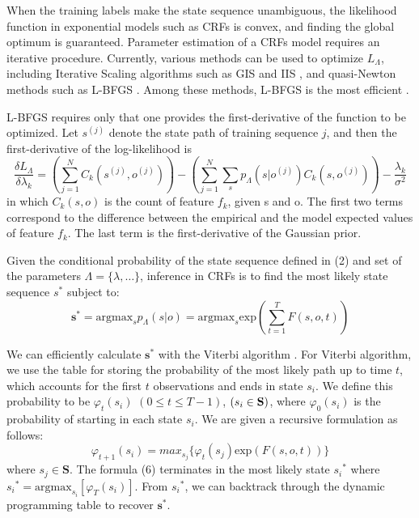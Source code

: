 \documentclass[english]{jnlp_1.4}
\begin{document}
When the training labels make the state sequence unambiguous, the
likelihood function in exponential models such as CRFs is convex,
and finding the global optimum is guaranteed. Parameter estimation
of a CRFs model requires an iterative procedure. Currently, various
methods can be used to optimize $L_\Lambda$, including Iterative
Scaling algorithms such as GIS and IIS \cite{Lafferty2001}, and
quasi-Newton methods such as L-BFGS \cite{Sha2003}. Among these
methods, L-BFGS is the most efficient \cite{Malouf2002,Sha2003}.

L-BFGS requires only that one provides the first-derivative of the
function to be optimized. Let $s^{(j)}$ denote the state path of
training sequence $j$, and then the first-derivative of the
log-likelihood is
\begin{equation}
\frac{\delta L_\Lambda}{\delta \lambda_k} 
  = \left(\sum_{j=1}^NC_k(s^{(j)}, o^{(j)})\right)- {}
	\left(\sum_{j=1}^N\sum_{s}p_\Lambda(s|o^{(j)})C_k(s,
	o^{(j)})\right)-\frac{\lambda_k}{\sigma^2}
\end{equation}
in which $C_k(s,o)$ is the count of feature $f_k$, given s
and o. The first two terms correspond to the difference between the
empirical and the model expected values of feature $f_k$. The last
term is the first-derivative of the Gaussian prior.


Given the conditional probability of the state sequence defined in
(2) and set of the parameters $\Lambda = \{\lambda,\dots \}$,
inference in CRFs is to find the most likely state sequence $s^*$
subject to:
\[
\boldsymbol{s}^*  =  \mathrm{argmax}_s p_\Lambda(s|o)
    =  \mathrm{argmax}_s \mathrm{exp}\left(\sum_{t=1}^TF(s, o,t)\right)
\]

We can efficiently calculate $\boldsymbol{s}^*$ with the Viterbi
algorithm \cite{Rabiner1989}. For Viterbi algorithm, we use the
table for storing the probability of the most likely path up to
time $t$, which accounts for the first $t$ observations and ends
in state $s_i$. We define this probability to be
${\varphi}_t(s_i)$ $( 0 \leq t \leq T-1)$, $(s_i \in {\bf S})$,
where ${\varphi}_0(s_i)$ is the probability of starting in each
state $s_i$. We are given a recursive formulation as follows:
\begin{equation}
{\varphi}_{t+1}(s_i) = max_{s_j}\{ {\varphi}_t(s_j) \mathrm{exp}
(F(s,o,t))\}
\end{equation}
where $s_j \in \boldsymbol{S}$. The formula (6) terminates in
the most likely state ${s_i}^*$ where ${s_i}^* = \mathrm{argmax}_{s_i}
[{\varphi}_{T}(s_i)]$. From ${s_i}^*$, we can backtrack through
the dynamic programming table to recover $\boldsymbol{s}^*$.
\end{document}
